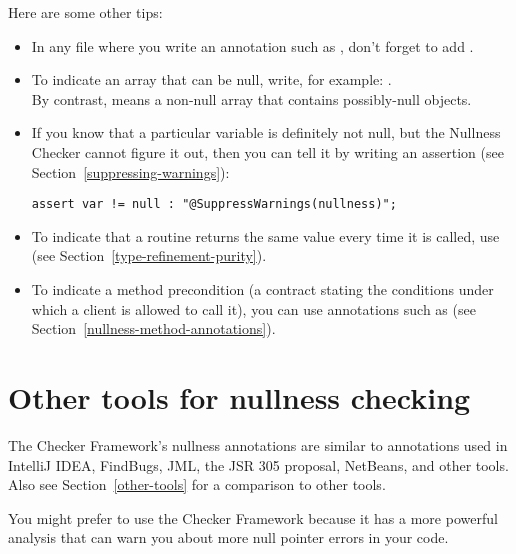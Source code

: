 Here are some other tips:
\begin{itemize}
\item
    \begin{sloppypar}
    In any file where you write an annotation such as ,
    don't forget to add .
    \end{sloppypar}
\item
    To indicate an array that can be null, write, for example: . \\
    By contrast,  means a non-null array that
    contains possibly-null objects.
\item
    If you know that a particular variable is definitely not null, but the
    Nullness Checker cannot figure it out, then you can tell it by writing
    an assertion (see Section~\ref{suppressing-warnings}):
\begin{Verbatim}
assert var != null : "@SuppressWarnings(nullness)";
\end{Verbatim}
\item
    To indicate that a routine returns the same value every time it is
    called, use  (see Section~\ref{type-refinement-purity}).
\item
    To indicate a method precondition (a contract stating the conditions
    under which a client is allowed to call it), you can use annotations
    such as  (see Section~\ref{nullness-method-annotations}).
\end{itemize}



\section{Other tools for nullness checking\label{nullness-related-work}}

\newcommand{\linktoNonNull}{\refclass{checker/nullness/qual}{NonNull}}
\newcommand{\linktoNullable}{\refclass{checker/nullness/qual}{Nullable}}

The Checker Framework's nullness annotations are similar to annotations used
in IntelliJ IDEA, FindBugs, JML, the JSR 305 proposal, NetBeans, and other tools.  Also
see Section~\ref{other-tools} for a comparison to other tools.

You might prefer to use the Checker Framework because it has a more
powerful analysis that can warn you about more null pointer errors in your
code.

